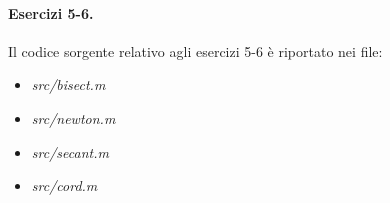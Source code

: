 \paragraph{Esercizi 5-6.} Il codice sorgente relativo agli esercizi 5-6 è riportato nei file:
\begin{itemize}
  \item \emph{src/bisect.m}
  \item \emph{src/newton.m}
  \item \emph{src/secant.m}
  \item \emph{src/cord.m}
\end{itemize}